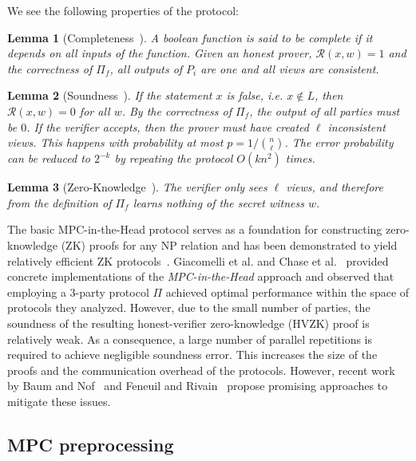 \documentclass[twoside,11pt]{report}
\theoremstyle{definition}
\theoremstyle{plain}
\newtheorem{lemma}{Lemma}[section]
\begin{document}
We see the following properties of the protocol:

\begin{lemma}[Completeness~\cite{ishai2007zero}]\label{def:mpcinth_completeness}
  A boolean function is said to be complete if it depends on all inputs of the function. Given an honest prover, $\mathcal{R}(x,w) = 1$ and the correctness of $\Pi_f$, all outputs of $P_i$ are one and all views are consistent.
\end{lemma}

\begin{lemma}[Soundness~\cite{ishai2007zero}]
  If the statement $x$ is false, i.e. $x \notin L$, then $\mathcal{R}(x,w) = 0$ for all $w$. By the correctness of $\Pi_f$, the output of all parties must be $0$. If the verifier accepts, then the prover must have created $\ell$ inconsistent views. This happens with probability at most $p = 1 / \binom{n}{\ell}$. The error probability can be reduced to $2^{-k}$ by repeating the protocol $O(kn^2)$ times.
\end{lemma}

\begin{lemma}[Zero-Knowledge~\cite{ishai2007zero}]
  The verifier only sees $\ell$ views, and therefore from the definition of $\Pi_f$ learns nothing of the secret witness $w$.
\end{lemma}

The basic MPC-in-the-Head protocol serves as a foundation for constructing zero-knowledge (ZK) proofs for any NP relation and has been demonstrated to yield relatively efficient ZK protocols~\cite{feneuil2023threshold,baum2020concretely,katz2018improved}. Giacomelli et al. and Chase et al.~\cite{katz2018improved,giacomelli2016zkboo,chase2017post} provided concrete implementations of the \emph{MPC-in-the-Head} approach and observed that employing a 3-party protocol $\Pi$ achieved optimal performance within the space of protocols they analyzed. However, due to the small number of parties, the soundness of the resulting honest-verifier zero-knowledge (HVZK) proof is relatively weak. As a consequence, a large number of parallel repetitions is required to achieve negligible soundness error. This increases the size of the proofs and the communication overhead of the protocols. However, recent work by Baum and Nof~\cite{baum2020concretely} and Feneuil and Rivain~\cite{feneuil2023threshold} propose promising approaches to mitigate these issues.

\subsection{MPC preprocessing}
\end{document}
